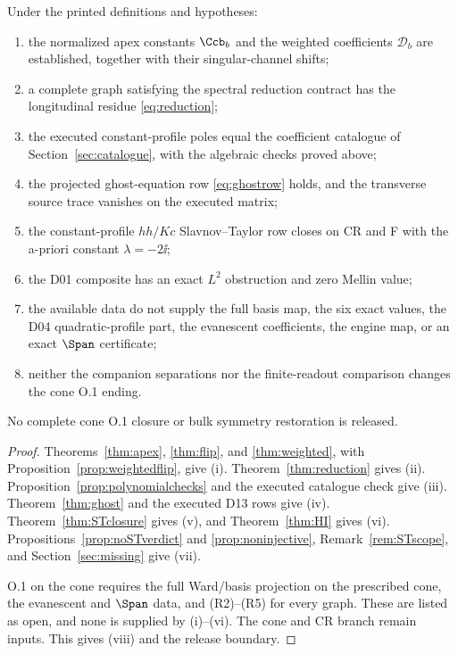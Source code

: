\begin{theorem}
\label{thm:release}
Under the printed definitions and hypotheses:
\begin{enumerate}[label=\textup{(\roman*)}]
\item the normalized apex constants \(\Ccb_b\) and the weighted
coefficients \(\mathcal D_b\) are established, together with their
singular-channel shifts;
\item a complete graph satisfying the spectral reduction contract
has the longitudinal residue \eqref{eq:reduction};
\item the executed constant-profile poles equal the coefficient
catalogue of Section~\ref{sec:catalogue}, with the algebraic checks
proved above;
\item the projected ghost-equation row \eqref{eq:ghostrow} holds,
and the transverse source trace vanishes on the executed matrix;
\item the constant-profile \(hh/Kc\) Slavnov--Taylor row closes on
CR and F with the a-priori constant \(\lambda=-2\ii\);
\item the D01 composite has an exact \(L^2\) obstruction and zero
Mellin value;
\item the available data do not supply the full basis map, the six
exact values, the D04 quadratic-profile part, the evanescent
coefficients, the engine map, or an exact \(\Span\) certificate;
\item neither the companion separations nor the finite-readout
comparison changes the cone O.1 ending.
\end{enumerate}
No complete cone O.1 closure or bulk symmetry restoration is
released.
\end{theorem}

\begin{proof}
Theorems~\ref{thm:apex}, \ref{thm:flip}, and \ref{thm:weighted},
with Proposition~\ref{prop:weightedflip}, give (i).
Theorem~\ref{thm:reduction} gives (ii).
Proposition~\ref{prop:polynomialchecks} and the executed catalogue
check give (iii).
Theorem~\ref{thm:ghost} and the executed D13 rows give (iv).
Theorem~\ref{thm:STclosure} gives (v), and Theorem~\ref{thm:HI}
gives (vi).
Propositions~\ref{prop:noSTverdict} and \ref{prop:noninjective},
Remark~\ref{rem:STscope}, and Section~\ref{sec:missing} give (vii).

O.1 on the cone requires the full Ward/basis projection on the
prescribed cone, the evanescent and \(\Span\) data, and (R2)--(R5)
for every graph.
These are listed as open, and none is supplied by (i)--(vi).
The cone and CR branch remain inputs.
This gives (viii) and the release boundary.
\end{proof}

